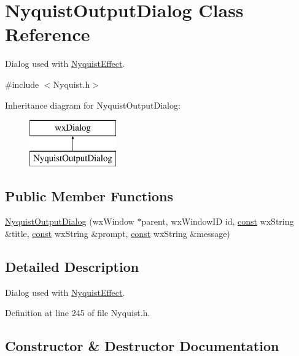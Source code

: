 \hypertarget{class_nyquist_output_dialog}{}\section{Nyquist\+Output\+Dialog Class Reference}
\label{class_nyquist_output_dialog}


Dialog used with \hyperlink{class_nyquist_effect}{Nyquist\+Effect}.  




{\ttfamily \#include $<$Nyquist.\+h$>$}

Inheritance diagram for Nyquist\+Output\+Dialog\+:\begin{figure}[H]
\begin{center}
\leavevmode
\includegraphics[height=2.000000cm]{class_nyquist_output_dialog}
\end{center}
\end{figure}
\subsection*{Public Member Functions}
\begin{DoxyCompactItemize}
\item 
\hyperlink{class_nyquist_output_dialog_ae541823a3e69b333a79231b7670d2af2}{Nyquist\+Output\+Dialog} (wx\+Window $\ast$parent, wx\+Window\+ID id, \hyperlink{getopt1_8c_a2c212835823e3c54a8ab6d95c652660e}{const} wx\+String \&title, \hyperlink{getopt1_8c_a2c212835823e3c54a8ab6d95c652660e}{const} wx\+String \&prompt, \hyperlink{getopt1_8c_a2c212835823e3c54a8ab6d95c652660e}{const} wx\+String \&message)
\end{DoxyCompactItemize}


\subsection{Detailed Description}
Dialog used with \hyperlink{class_nyquist_effect}{Nyquist\+Effect}. 

Definition at line 245 of file Nyquist.\+h.



\subsection{Constructor \& Destructor Documentation}
